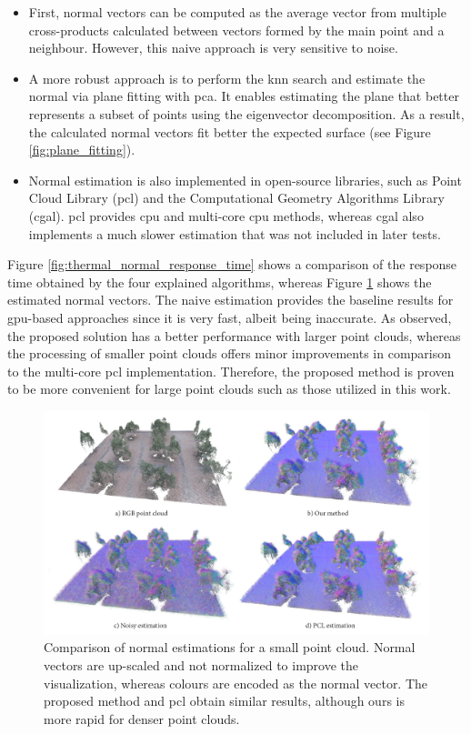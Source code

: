 \begin{itemize}
    \item First, normal vectors can be computed as the average vector from multiple cross-products calculated between vectors formed by the main point and a neighbour. However, this naive approach is very sensitive to noise.
    \item A more robust approach is to perform the \acrshort{knn} search and estimate the normal via plane fitting with \acrshort{pca}. It enables estimating the plane that better represents a subset of points \cite{sanchez_robust_2020} using the eigenvector decomposition. As a result, the calculated normal vectors fit better the expected surface (see Figure \ref{fig:plane_fitting}).
    \item Normal estimation is also implemented in open-source libraries, such as Point Cloud Library (\acrshort{pcl}) and the Computational Geometry Algorithms Library (\acrshort{cgal}). \acrshort{pcl} provides \acrshort{cpu} and multi-core \acrshort{cpu} methods, whereas \acrshort{cgal} also implements a much slower estimation that was not included in later tests.
\end{itemize}

Figure \ref{fig:thermal_normal_response_time} shows a comparison of the response time obtained by the four explained algorithms, whereas Figure \ref{fig:thermal_normal_estimation} shows the estimated normal vectors. The naive estimation provides the baseline results for \acrshort{gpu}-based approaches since it is very fast, albeit being inaccurate. As observed, the proposed solution has a better performance with larger point clouds, whereas the processing of smaller point clouds offers minor improvements in comparison to the multi-core \acrshort{pcl} implementation. Therefore, the proposed method is proven to be more convenient for large point clouds such as those utilized in this work.

\begin{figure} 
    \centering
    \includegraphics[width=\linewidth]{figs/thermal_projection/normal_estimation.png}
	\caption{Comparison of normal estimations for a small point cloud. Normal vectors are up-scaled and not normalized to improve the visualization, whereas colours are encoded as the normal vector. The proposed method and \acrshort{pcl} obtain similar results, although ours is more rapid for denser point clouds.}
	\label{fig:thermal_normal_estimation}
\end{figure}

